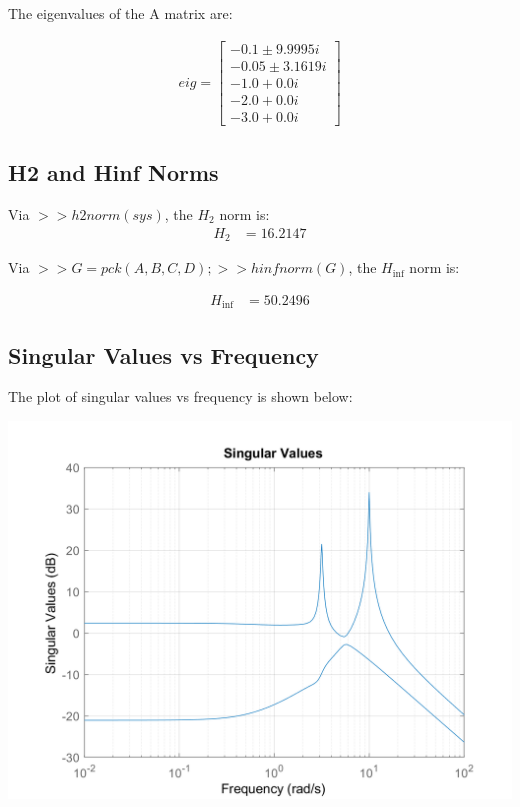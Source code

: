 \documentclass[]{article}
\begin{document}
\noindent The eigenvalues of the A matrix are:

\begin{align*}
	eig = \begin{bmatrix}
	-0.1 \pm 9.9995i \\
	-0.05 \pm 3.1619i \\
	-1.0 + 0.0i \\
	-2.0 + 0.0i \\
	-3.0 + 0.0i
	\end{bmatrix}
\end{align*}

\subsection{H2 and Hinf Norms}

\noindent Via $>>h2norm(sys)$, the $H_2$ norm is:
\begin{align*}
	H_2 &= 16.2147
\end{align*}

\noindent Via $>>G = pck(A, B, C, D); >>hinfnorm(G)$, the $H_{\inf}$ norm is:

\begin{align*}
	H_{\inf} &= 50.2496 
\end{align*}

\subsection{Singular Values vs Frequency}

The plot of singular values vs frequency is shown below:

\includegraphics[width=\textwidth]{singular_values.png}
\end{document}
